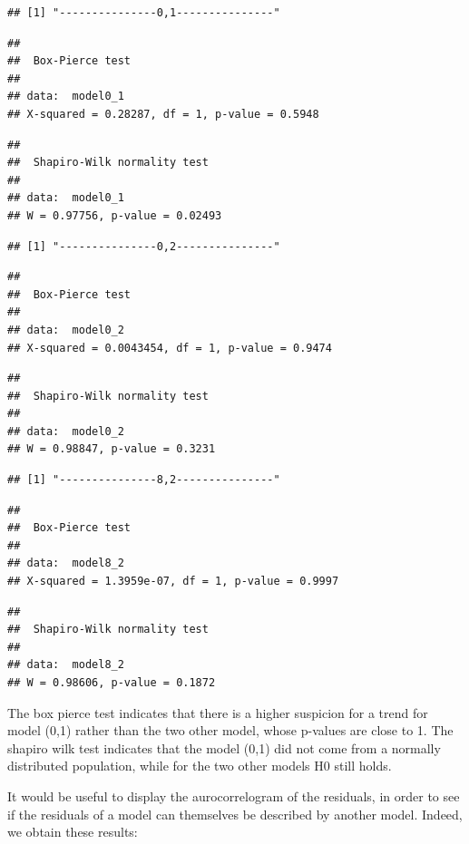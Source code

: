 \documentclass[]{article}
\begin{document}
\begin{verbatim}
## [1] "---------------0,1---------------"
\end{verbatim}

\begin{verbatim}
## 
##  Box-Pierce test
## 
## data:  model0_1
## X-squared = 0.28287, df = 1, p-value = 0.5948
\end{verbatim}

\begin{verbatim}
## 
##  Shapiro-Wilk normality test
## 
## data:  model0_1
## W = 0.97756, p-value = 0.02493
\end{verbatim}

\begin{verbatim}
## [1] "---------------0,2---------------"
\end{verbatim}

\begin{verbatim}
## 
##  Box-Pierce test
## 
## data:  model0_2
## X-squared = 0.0043454, df = 1, p-value = 0.9474
\end{verbatim}

\begin{verbatim}
## 
##  Shapiro-Wilk normality test
## 
## data:  model0_2
## W = 0.98847, p-value = 0.3231
\end{verbatim}

\begin{verbatim}
## [1] "---------------8,2---------------"
\end{verbatim}

\begin{verbatim}
## 
##  Box-Pierce test
## 
## data:  model8_2
## X-squared = 1.3959e-07, df = 1, p-value = 0.9997
\end{verbatim}

\begin{verbatim}
## 
##  Shapiro-Wilk normality test
## 
## data:  model8_2
## W = 0.98606, p-value = 0.1872
\end{verbatim}

The box pierce test indicates that there is a higher suspicion for a
trend for model (0,1) rather than the two other model, whose p-values
are close to 1. The shapiro wilk test indicates that the model (0,1) did
not come from a normally distributed population, while for the two other
models H0 still holds.

It would be useful to display the aurocorrelogram of the residuals, in
order to see if the residuals of a model can themselves be described by
another model. Indeed, we obtain these results:
\end{document}

